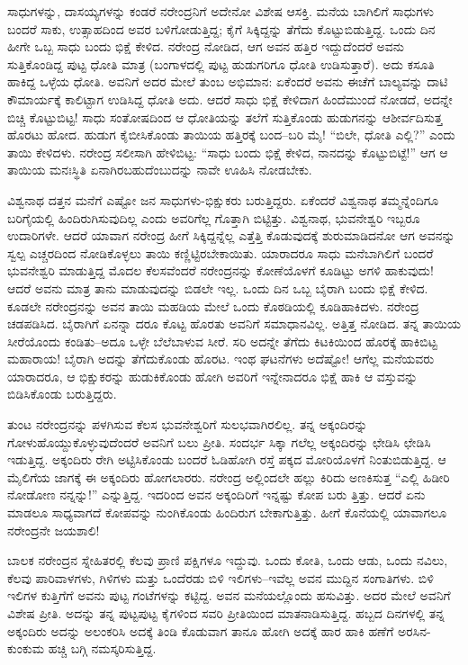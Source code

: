 ಸಾಧುಗಳನ್ನು, ದಾಸಯ್ಯಗಳನ್ನು ಕಂಡರೆ ನರೇಂದ್ರನಿಗೆ ಅದೇನೋ ವಿಶೇಷ ಆಸಕ್ತಿ. ಮನೆಯ ಬಾಗಿಲಿಗೆ ಸಾಧುಗಳು ಬಂದರೆ ಸಾಕು, ಉತ್ಸಾಹದಿಂದ ಅವರ ಬಳಿಗೋಡುತ್ತಿದ್ದ; ಕೈಗೆ ಸಿಕ್ಕಿದ್ದನ್ನು ತೆಗೆದು ಕೊಟ್ಟುಬಿಡುತ್ತಿದ್ದ. ಒಂದು ದಿನ ಹೀಗೇ ಒಬ್ಬ ಸಾಧು ಬಂದು ಭಿಕ್ಷೆ ಕೇಳಿದ. ನರೇಂದ್ರ ನೋಡಿದ, ಆಗ ಅವನ ಹತ್ತಿರ ಇದ್ದುದೆಂದರೆ ಅವನು ಸುತ್ತಿಕೊಂಡಿದ್ದ ಪುಟ್ಟ ಧೋತಿ ಮಾತ್ರ (ಬಂಗಾಳದಲ್ಲಿ ಪುಟ್ಟ ಹುಡುಗರಿಗೂ ಧೋತಿ ಉಡಿಸುತ್ತಾರೆ). ಅದು ಕಸೂತಿ ಹಾಕಿದ್ದ ಒಳ್ಳೆಯ ಧೋತಿ. ಅವನಿಗೆ ಅದರ ಮೇಲೆ ತುಂಬ ಅಭಿಮಾನ: ಏಕೆಂದರೆ ಅವನು ಈಚೆಗೆ ಬಾಲ್ಯವನ್ನು ದಾಟಿ ಕೌಮಾರ್ಯಕ್ಕೆ ಕಾಲಿಟ್ಟಾಗ ಉಡಿಸಿದ್ದ ಧೋತಿ ಅದು. ಆದರೆ ಸಾಧು ಭಿಕ್ಷೆ ಕೇಳಿದಾಗ ಹಿಂದೆಮುಂದೆ ನೋಡದೆ, ಅದನ್ನೇ ಬಿಚ್ಚಿ ಕೊಟ್ಟುಬಿಟ್ಟ! ಸಾಧು ಸಂತೋಷದಿಂದ ಆ ಧೋತಿಯನ್ನು ತಲೆಗೆ ಸುತ್ತಿಕೊಂಡು ಹುಡುಗನನ್ನು ಆಶೀರ್ವದಿಸುತ್ತ ಹೊರಟು ಹೋದ. ಹುಡುಗ ಕೈಬೀಸಿಕೊಂಡು ತಾಯಿಯ ಹತ್ತಿರಕ್ಕೆ ಬಂದ–ಬರಿ ಮೈ! “ಬಿಲೇ, ಧೋತಿ ಎಲ್ಲಿ?” ಎಂದು ತಾಯಿ ಕೇಳಿದಳು. ನರೇಂದ್ರ ಸಲೀಸಾಗಿ ಹೇಳಿಬಿಟ್ಟ: “ಸಾಧು ಬಂದು ಭಿಕ್ಷೆ ಕೇಳಿದ, ನಾನದನ್ನು ಕೊಟ್ಟುಬಿಟ್ಟೆ!” ಆಗ ಆ ತಾಯಿಯ ಮನಃಸ್ಥಿತಿ ಏನಾಗಿರಬಹುದೆಂಬುದನ್ನು ನಾವೇ ಊಹಿಸಿ ನೋಡಬೇಕು.

ವಿಶ್ವನಾಥ ದತ್ತನ ಮನೆಗೆ ಎಷ್ಟೋ ಜನ ಸಾಧುಗಳು-ಭಿಕ್ಷುಕರು ಬರುತ್ತಿದ್ದರು. ಏಕೆಂದರೆ ವಿಶ್ವನಾಥ ತಮ್ಮನ್ನೆಂದಿಗೂ ಬರಿಗೈಯಲ್ಲಿ ಹಿಂದಿರುಗಿಸುವುದಿಲ್ಲ ಎಂದು ಅವರಿಗೆಲ್ಲ ಗೊತ್ತಾಗಿ ಬಿಟ್ಟಿತ್ತು. ವಿಶ್ವನಾಥ, ಭುವನೇಶ್ವರಿ ಇಬ್ಬರೂ ಉದಾರಿಗಳೇ. ಆದರೆ ಯಾವಾಗ ನರೇಂದ್ರ ಹೀಗೆ ಸಿಕ್ಕಿದ್ದನ್ನೆಲ್ಲ ಎತ್ತೆತ್ತಿ ಕೊಡುವುದಕ್ಕೆ ಶುರುಮಾಡಿದನೋ ಆಗ ಅವನನ್ನು ಸ್ವಲ್ಪ ಎಚ್ಚರದಿಂದ ನೋಡಿಕೊಳ್ಳಲು ತಾಯಿ ಕಣ್ಣಿಟ್ಟಿರಬೇಕಾಯಿತು. ಯಾರಾದರೂ ಸಾಧು ಮನೆಬಾಗಿಲಿಗೆ ಬಂದರೆ ಭುವನೇಶ್ವರಿ ಮಾಡುತ್ತಿದ್ದ ಮೊದಲ ಕೆಲಸವೆಂದರೆ ನರೇಂದ್ರನನ್ನು ಕೋಣೆಯೊಳಗೆ ಕೂಡಿಟ್ಟು ಅಗಳಿ ಹಾಕುವುದು! ಆದರೆ ಅವನು ಮಾತ್ರ ತಾನು ಮಾಡುವುದನ್ನು ಬಿಡಲೇ ಇಲ್ಲ. ಒಂದು ದಿನ ಒಬ್ಬ ಬೈರಾಗಿ ಬಂದು ಭಿಕ್ಷೆ ಕೇಳಿದ. ಕೂಡಲೇ ನರೇಂದ್ರನನ್ನು ಅವನ ತಾಯಿ ಮಹಡಿಯ ಮೇಲೆ ಒಂದು ಕೊಠಡಿಯಲ್ಲಿ ಕೂಡಿಹಾಕಿದಳು. ನರೇಂದ್ರ ಚಡಪಡಿಸಿದ. ಬೈರಾಗಿಗೆ ಏನನ್ನಾ ದರೂ ಕೊಟ್ಟ ಹೊರತು ಅವನಿಗೆ ಸಮಾಧಾನವಿಲ್ಲ. ಅತ್ತಿತ್ತ ನೋಡಿದ. ತನ್ನ ತಾಯಿಯ ಸೀರೆಯೊಂದು ಕಂಡಿತು–ಅದೂ ಒಳ್ಳೇ ಬೆಲೆಬಾಳುವ ಸೀರೆ. ಸರಿ ಅದನ್ನೇ ತೆಗೆದು ಕಿಟಕಿಯಿಂದ ಹೊರಕ್ಕೆ ಹಾಕಿಬಿಟ್ಟ ಮಹಾರಾಯ! ಬೈರಾಗಿ ಅದನ್ನು ತೆಗೆದುಕೊಂಡು ಹೊರಟ. ಇಂಥ ಘಟನೆಗಳು ಅದೆಷ್ಟೋ! ಆಗೆಲ್ಲ ಮನೆಯವರು ಯಾರಾದರೂ, ಆ ಭಿಕ್ಷುಕರನ್ನು ಹುಡುಕಿಕೊಂಡು ಹೋಗಿ ಅವರಿಗೆ ಇನ್ನೇನಾದರೂ ಭಿಕ್ಷೆ ಹಾಕಿ ಆ ವಸ್ತುವನ್ನು ಬಿಡಿಸಿಕೊಂಡು ಬರುತ್ತಿದ್ದರು.

ತುಂಟ ನರೇಂದ್ರನನ್ನು ಪಳಗಿಸುವ ಕೆಲಸ ಭುವನೇಶ್ವರಿಗೆ ಸುಲಭವಾಗಿರಲಿಲ್ಲ. ತನ್ನ ಅಕ್ಕಂದಿರನ್ನು ಗೋಳುಹೊಯ್ದುಕೊಳ್ಳುವುದೆಂದರೆ ಅವನಿಗೆ ಬಲು ಪ್ರೀತಿ. ಸಂದರ್ಭ ಸಿಕ್ಕಾ ಗಲೆಲ್ಲ ಅಕ್ಕಂದಿರನ್ನು ಛೇಡಿಸಿ ಛೇಡಿಸಿ ಇಡುತ್ತಿದ್ದ. ಅಕ್ಕಂದಿರು ರೇಗಿ ಅಟ್ಟಿಸಿಕೊಂಡು ಬಂದರೆ ಓಡಿಹೋಗಿ ರಸ್ತೆ ಪಕ್ಕದ ಮೋರಿಯೊಳಗೆ ನಿಂತುಬಿಡುತ್ತಿದ್ದ. ಆ ಮೈಲಿಗೆಯ ಜಾಗಕ್ಕೆ ಈ ಅಕ್ಕಂದಿರು ಹೋಗಲಾರರು. ನರೇಂದ್ರ ಅಲ್ಲಿಂದಲೇ ಹಲ್ಲು ಕಿರಿದು ಅಣಕಿಸುತ್ತ “ಎಲ್ಲಿ ಹಿಡೀರಿ ನೋಡೋಣ ನನ್ನನ್ನು!” ಎನ್ನುತ್ತಿದ್ದ. ಇದರಿಂದ ಅವನ ಅಕ್ಕಂದಿರಿಗೆ ಇನ್ನಷ್ಟು ಕೋಪ ಬರು ತ್ತಿತ್ತು. ಆದರೆ ಏನು ಮಾಡಲೂ ಸಾಧ್ಯವಾಗದೆ ಕೋಪವನ್ನು ನುಂಗಿಕೊಂಡು ಹಿಂದಿರುಗ ಬೇಕಾಗುತ್ತಿತ್ತು. ಹೀಗೆ ಕೊನೆಯಲ್ಲಿ ಯಾವಾಗಲೂ ನರೇಂದ್ರನೇ ಜಯಶಾಲಿ!

ಬಾಲಕ ನರೇಂದ್ರನ ಸ್ನೇಹಿತರಲ್ಲಿ ಕೆಲವು ಪ್ರಾಣಿ ಪಕ್ಷಿಗಳೂ ಇದ್ದುವು. ಒಂದು ಕೋತಿ, ಒಂದು ಆಡು, ಒಂದು ನವಿಲು, ಕೆಲವು ಪಾರಿವಾಳಗಳು, ಗಿಳಿಗಳು ಮತ್ತು ಒಂದೆರಡು ಬಿಳಿ ಇಲಿಗಳು–ಇವೆಲ್ಲ ಅವನ ಮುದ್ದಿನ ಸಂಗಾತಿಗಳು. ಬಿಳಿ ಇಲಿಗಳ ಕುತ್ತಿಗೆಗೆ ಅವನು ಪುಟ್ಟ ಗಂಟೆಗಳನ್ನು ಕಟ್ಟಿದ್ದ. ಅವನ ಮನೆಯಲ್ಲೊಂದು ಹಸುವಿತ್ತು. ಅದರ ಮೇಲೆ ಅವನಿಗೆ ವಿಶೇಷ ಪ್ರೀತಿ. ಅದನ್ನು ತನ್ನ ಪುಟ್ಟಪುಟ್ಟ ಕೈಗಳಿಂದ ಸವರಿ ಪ್ರೀತಿಯಿಂದ ಮಾತನಾಡಿಸುತ್ತಿದ್ದ. ಹಬ್ಬದ ದಿನಗಳಲ್ಲಿ ತನ್ನ ಅಕ್ಕಂದಿರು ಅದನ್ನು ಅಲಂಕರಿಸಿ ಅದಕ್ಕೆ ತಿಂಡಿ ಕೊಡುವಾಗ ತಾನೂ ಹೋಗಿ ಅದಕ್ಕೆ ಹಾರ ಹಾಕಿ ಹಣೆಗೆ ಅರಸಿನ-ಕುಂಕುಮ ಹಚ್ಚಿ ಬಗ್ಗಿ ನಮಸ್ಕರಿಸುತ್ತಿದ್ದ.


